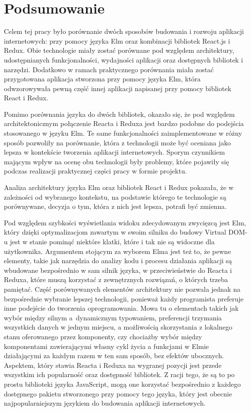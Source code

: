 \chapter{Podsumowanie} \label{chap:podsumowanie}
Celem tej pracy było porównanie dwóch sposobów budowania i rozwoju aplikacji internetowych: przy pomocy języka Elm oraz kombinacji bibliotek React.js i Redux. 
Obie technologie miały zostać porównane pod względem architektury, udostępnianych funkcjonalności, wydajności aplikacji oraz dostępnych bibliotek i narzędzi. Dodatkowo w ramach praktycznego porównania miała zostać przygotowana aplikacja stworzona przy pomocy języka Elm, która odwzorowywała pewną część innej aplikacji napisanej przy pomocy bibliotek React i Redux. 

Pomimo porównania języka do dwóch bibliotek, okazało się, że pod względem architektonicznym połączenie Reacta i Reduxa jest bardzo podobne do podejścia stosowanego w języku Elm. Te same funkcjonalności zaimplementowane w różny sposób pozwoliły na porównanie, która z technologii może być oceniana jako lepsza w kontekście tworzenia aplikacji internetowych. Sporym czynnikiem mającym wpływ na ocenę obu technologii były problemy, które pojawiły się podczas realizacji praktycznej części pracy w formie projektu. 

Analiza architektury języka Elm oraz bibliotek React i Redux pokazała, że w zależności od wybranego kontekstu, na podstawie którego te technologie są porównywane, decyzja o tym, która z nich jest lepsza, potrafi być zmienna. 

Pod względem szybkości wyświetlania widoku zdecydowanym zwycięzcą jest Elm, który dzięki optymalizacjom zawartym w swoim silniku do budowy Virtual DOM-u jest w stanie pominąć niektóre klatki, które i tak nie są widoczne dla użytkownika. Argumentem stojącym za wyborem Elma jest też to, że pewne elementy, takie jak narzędzia do analizy kodu i procesu działania aplikacji są wbudowane bezpośrednio w sam silnik języka, w przeciwieństwie do Reacta i Reduxa, które muszą korzystać z zewnętrznych rozwiązań, o których trzeba pamiętać. Część porównywanych elementów architektury nie pozwala jednak na bezpośrednie wybranie lepszej technologii, ponieważ każdy programista preferuje inne podejście do tworzenia oprogramowania. Mowa tu o elementach takich jak wybór między silnym a~dynamicznym typowaniem, preferencji trzymania wszystkich danych w jednym miejscu, a możliwością skorzystania z lokalnego stanu oferowanego przez komponenty, czy chociażby wybór między komponentami zawierającymi własny cykl życia a funkcjami w Elmie działającymi za każdym razem w ten sam sposób, bez efektów ubocznych. Aspektem, który stawia Reacta i Reduxa na wygranej pozycji jest przede wszystkim ich popularność oraz dostępność bibliotek. Z racji tego, że są to po prostu biblioteki języka JavaScript, mogą one korzystać bezpośrednio z każdego dostępnego pakietu stworzonego przy pomocy tego języka, który jest obecnie najpopularniejszym językiem do budowania aplikacji internetowych.

